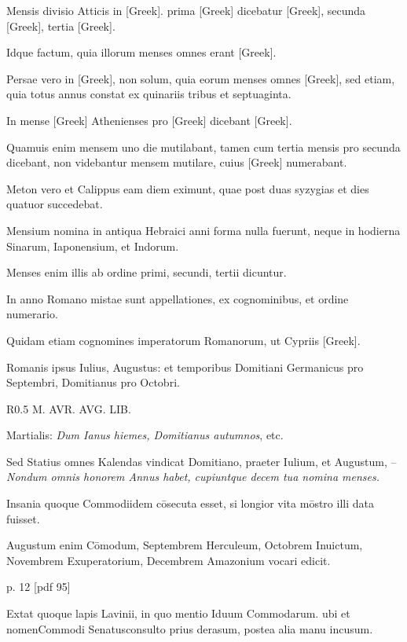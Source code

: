 Mensis divisio Atticis in \textgreek{[Greek]}.
 prima \textgreek{[Greek]} dicebatur \textgreek{[Greek]},
secunda \textgreek{[Greek]}, tertia \textgreek{[Greek]}.

Idque factum, quia
illorum menses omnes erant \textgreek{[Greek]}.

Persae vero in \textgreek{[Greek]},
non solum, quia eorum menses omnes \textgreek{[Greek]}, sed etiam, quia
totus annus constat ex quinariis tribus et septuaginta.

In mense \textgreek{[Greek]}
Athenienses pro \textgreek{[Greek]} dicebant \textgreek{[Greek]}.

Quamuis
enim mensem uno die mutilabant, tamen cum tertia mensis
pro secunda dicebant, non videbantur mensem mutilare, cuius
\textgreek{[Greek]} numerabant.

Meton vero et Calippus eam diem eximunt,
quae post duas syzygias et dies quatuor succedebat.

Mensium nomina
in antiqua Hebraici anni forma nulla fuerunt, neque in hodierna
Sinarum, Iaponensium, et Indorum.

Menses enim illis ab ordine
primi, secundi, tertii dicuntur.

In anno Romano mistae sunt appellationes,
ex cognominibus, et ordine numerario.

Quidam etiam cognomines
imperatorum Romanorum, ut Cypriis \textgreek{[Greek]}.

Romanis ipsus Iulius, Augustus: et temporibus Domitiani
Germanicus pro Septembri, Domitianus pro Octobri.

\begin{wrapfigure}[16]{R}{0.5\textwidth}
  \centering
  {M. AVR. AVG. LIB.}
\end{wrapfigure}

Martialis:
 \textit{Dum Ianus hiemes, Domitianus
autumnos}, etc.

Sed Statius omnes
Kalendas vindicat Domitiano,
praeter Iulium, et Augustum,
– \textit{Nondum omnis honorem
Annus habet, cupiuntque decem tua
nomina menses.}

Insania quoque
Commodiidem cōsecuta esset, si
longior vita mōstro illi data fuisset.

Augustum enim Cōmodum,
Septembrem Herculeum, Octobrem
Inuictum, Novembrem
Exuperatorium, Decembrem
Amazonium vocari edicit.


p. 12 [pdf 95]

Extat
quoque lapis Lavinii, in quo mentio
Iduum Commodarum. ubi et
nomenCommodi Senatusconsulto prius derasum, postea alia manu
incusum.

